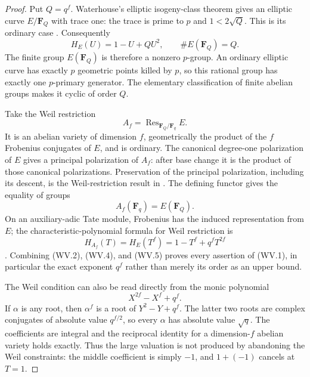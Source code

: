 \documentclass[11pt,a4paper]{article}
\begin{document}
\begin{proof}
Put $Q=q^f$. Waterhouse's elliptic isogeny-class theorem gives
an elliptic curve $E/\mathbf F_Q$ with trace one: the trace is
prime to $p$ and $1<2\sqrt Q$. This is its ordinary case
\cite[Theorem~4.1(1), pp.~536--538; Corollary~4.4, p.~540]{Waterhouse1969AV}.
Consequently
\[
       H_E(U)=1-U+QU^2,
       \qquad \#E(\mathbf F_Q)=Q.
 \tag{WV.2}
\]
The finite group $E(\mathbf F_Q)$ is therefore a nonzero
$p$-group. An ordinary elliptic curve has exactly $p$ geometric
points killed by $p$, so this rational group has exactly one
$p$-primary generator. The elementary classification of finite
abelian groups makes it cyclic of order $Q$.

Take the Weil restriction
\[
               A_f=\operatorname{Res}_{\mathbf F_Q/\mathbf F_q}E.
 \tag{WV.3}
\]
It is an abelian variety of dimension $f$, geometrically the
product of the $f$ Frobenius conjugates of $E$, and is ordinary.
The canonical degree-one polarization of $E$ gives a principal
polarization of $A_f$: after base change it is the product of
those canonical polarizations. Preservation of the principal
polarization, including its descent, is the Weil-restriction
result in \cite[Proposition~1.22, pp.~27--28]{Diem2001Weil}.
The defining functor gives the equality of groups
\[
                  A_f(\mathbf F_q)=E(\mathbf F_Q).
 \tag{WV.4}
\]
On an auxiliary-adic Tate module, Frobenius has the induced
representation from $E$; the characteristic-polynomial formula
for Weil restriction is
\[
                  H_{A_f}(T)=H_E(T^f)
                              =1-T^f+q^fT^{2f}
 \tag{WV.5}
\]
\cite[Proposition~1.21, p.~26]{Diem2001Weil}.
Combining (WV.2), (WV.4), and (WV.5) proves every assertion
of (WV.1), in particular the exact exponent $q^f$ rather than
merely its order as an upper bound.

The Weil condition can also be read directly from the monic
polynomial
\[
                    X^{2f}-X^f+q^f.
 \tag{WV.6}
\]
If $\alpha$ is any root, then $\alpha^f$ is a root of
$Y^2-Y+q^f$. The latter two roots are complex conjugates of
absolute value $q^{f/2}$, so every $\alpha$ has absolute value
$\sqrt q$. The coefficients are integral and the reciprocal
identity for a dimension-$f$ abelian variety holds exactly.
Thus the large valuation is not produced by abandoning the
Weil constraints: the middle coefficient is simply $-1$,
and $1+(-1)$ cancels at $T=1$.
\end{proof}
\end{document}

